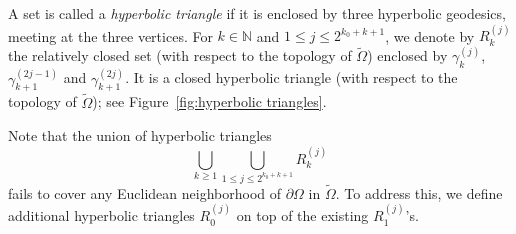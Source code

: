 \documentclass[reqno,11pt]{amsart}
\def\wz{\widetilde}
\numberwithin{equation}{section}
\theoremstyle{remark}
\begin{document}
A set is called a {\it hyperbolic triangle} if  it is enclosed by three 
hyperbolic geodesics, meeting at the three vertices.  
For $k\in \mathbb N$ and $1 \le j\le 2^{k_0+k+1}$, we denote by $ R_{k}^{(j)}$  
the relatively closed set (with respect to the topology of $\wz \Omega$) 
enclosed by $\gamma_k^{(j)}$, $\gamma_{k+1}^{(2j-1)}$ and $\gamma_{k+1}^{(2j)}$. 
It is a closed hyperbolic triangle 
(with respect to the topology of $\wz \Omega$); see Figure~\ref{fig:hyperbolic triangles}. 



 Note that the union of hyperbolic triangles
$$\bigcup_{k\ge 1} \bigcup_{1\le j\le 2^{k_0+k+1}} R_{k}^{(j)} $$
fails to cover any Euclidean neighborhood of $\partial \Omega$ in $\wz\Omega$. To address this, we define additional hyperbolic triangles $R_{0}^{(j)}$
on top of the existing $R_{1}^{(j)}$'s. 
\end{document}
